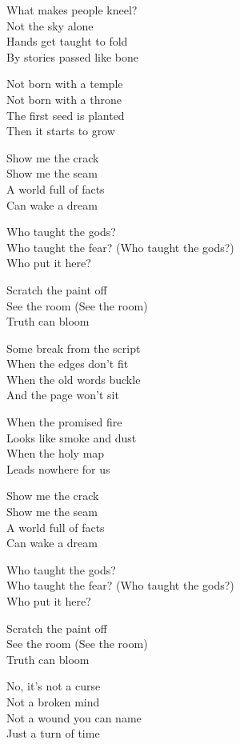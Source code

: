 \begin{lyrics}
What makes people kneel?\\
Not the sky alone\\
Hands get taught to fold\\
By stories passed like bone

Not born with a temple\\
Not born with a throne\\
The first seed is planted\\
Then it starts to grow

Show me the crack\\
Show me the seam\\
A world full of facts\\
Can wake a dream

Who taught the gods?\\
Who taught the fear?
(Who taught the gods?)\\
Who put it here?

Scratch the paint off\\
See the room
(See the room)\\
Truth can bloom

Some break from the script\\
When the edges don't fit\\
When the old words buckle\\
And the page won't sit

When the promised fire\\
Looks like smoke and dust\\
When the holy map\\
Leads nowhere for us

Show me the crack\\
Show me the seam\\
A world full of facts\\
Can wake a dream

Who taught the gods?\\
Who taught the fear?
(Who taught the gods?)\\
Who put it here?

Scratch the paint off\\
See the room
(See the room)\\
Truth can bloom

No, it's not a curse\\
Not a broken mind\\
Not a wound you can name\\
Just a turn of time


\end{lyrics}
